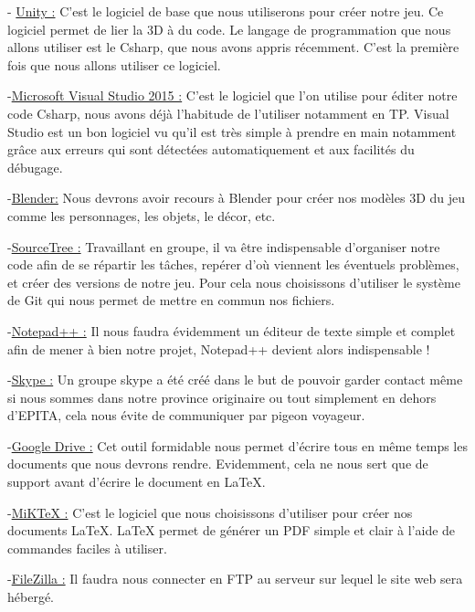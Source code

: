 \documentclass[a4paper]{article}
\begin{document}
- \underline{Unity :} 
C’est le logiciel de base que nous utiliserons pour créer notre jeu. Ce logiciel permet de lier la 3D à du code. Le langage de programmation que nous allons utiliser est le Csharp, que nous avons appris récemment. C’est la première fois que nous allons utiliser ce logiciel. 

\quad

-\underline{Microsoft Visual Studio 2015 :}
C’est le logiciel que l’on utilise pour éditer notre code Csharp, nous avons déjà l’habitude de l’utiliser notamment en TP. 
Visual Studio est un bon logiciel vu qu'il est très simple à prendre en main notamment grâce aux erreurs qui sont détectées automatiquement et aux facilités du débugage.

\quad

-\underline{Blender:}
 Nous devrons avoir recours à Blender pour créer nos modèles 3D du jeu comme les personnages, les objets, le décor, etc.

\quad

-\underline{SourceTree :}
Travaillant en groupe, il va être indispensable d’organiser notre code afin de se répartir les tâches, repérer d’où viennent les éventuels problèmes, et créer des versions de notre jeu. Pour cela nous choisissons d’utiliser le système de Git qui nous permet de mettre en commun nos fichiers.

\quad

-\underline{Notepad++ :}
Il nous faudra évidemment un éditeur de texte simple et complet afin de mener à bien notre projet, Notepad++ devient alors indispensable !

\quad

-\underline{Skype :}
Un groupe skype a été créé dans le but de pouvoir garder contact même si nous sommes dans notre province originaire ou tout simplement en dehors d'EPITA, cela nous évite de communiquer par pigeon voyageur.
 
\quad

-\underline{Google Drive :}
Cet outil formidable nous permet d’écrire tous en même temps les documents que nous devrons rendre. Evidemment, cela ne nous sert que de support avant d’écrire le document en LaTeX.

\quad

-\underline{MiKTeX :}
C’est le logiciel que nous choisissons d’utiliser pour créer nos documents LaTeX.
LaTeX permet de générer un PDF simple et clair à l’aide de commandes faciles à utiliser.

\quad

-\underline{FileZilla :}
Il faudra nous connecter en FTP au serveur sur lequel le site web sera hébergé.
\end{document}
